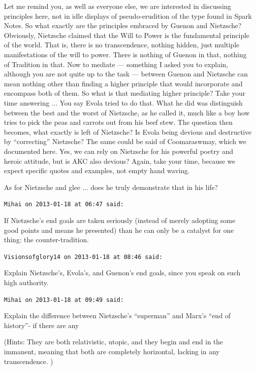 \begin{footnotesize}
\begin{sffamily}
Let me remind you, as well as everyone else, we are interested in discussing principles here, not in idle displays of pseudo-erudition of the type found in Spark Notes. So what exactly are the principles embraced by Guenon and Nietzsche? Obviously, Nietzsche claimed that the Will to Power is the fundamental principle of the world. That is, there is no transcendence, nothing hidden, just multiple manifestations of the will to power. There is nothing of Guenon in that, nothing of Tradition in that. Now to mediate --- something I asked you to explain, although you are not quite up to the task --- between Guenon and Nietzsche can mean nothing other than finding a higher principle that would incorporate and encompass both of them. So what is that mediating higher principle? Take your time answering ... You say Evola tried to do that. What he did was distinguish between the best and the worst of Nietzsche, as he called it, much like a boy how tries to pick the peas and carrots out from his beef stew. The question then becomes, what exactly is left of Nietzsche? Is Evola being devious and destructive by ``correcting'' Nietzsche? The same could be said of Coomaraswmay, which we documented here. Yes, we can rely on Nietzsche for his powerful poetry and heroic attitude, but is AKC also devious? Again, take your time, because we expect specific quotes and examples, not empty hand waving.

As for Nietzsche and glee ... does he truly demonstrate that in his life?

\hfill

\texttt{Mihai on 2013-01-18 at 06:47 said:}

If Nietzsche's end goals are taken seriously (instead of merely adopting some good points and means he presented) than he can only be a catalyst for one thing: the counter-tradition.

\hfill

\texttt{Visionsofglory14 on 2013-01-18 at 08:46 said:}

Explain Nietzsche's, Evola's, and Guenon's end goals, since you speak on such high authority.

\hfill

\texttt{Mihai on 2013-01-18 at 09:49 said:}

Explain the difference between Nietzsche's ``superman'' and Marx's ``end of history''- if there are any

(Hints: They are both relativistic, utopic, and they begin and end in the immanent, meaning that both are completely horizontal, lacking in any transcendence. )


\end{sffamily}
\end{footnotesize}
